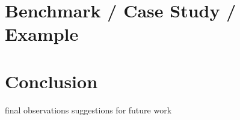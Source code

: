 \clearpage
\section{Benchmark / Case Study / Example}


\clearpage
\section{Conclusion}

final observations
suggestions for future work













































\clearemptydoublepage

\appendix
% 
% 
% 

\clearemptydoublepage





